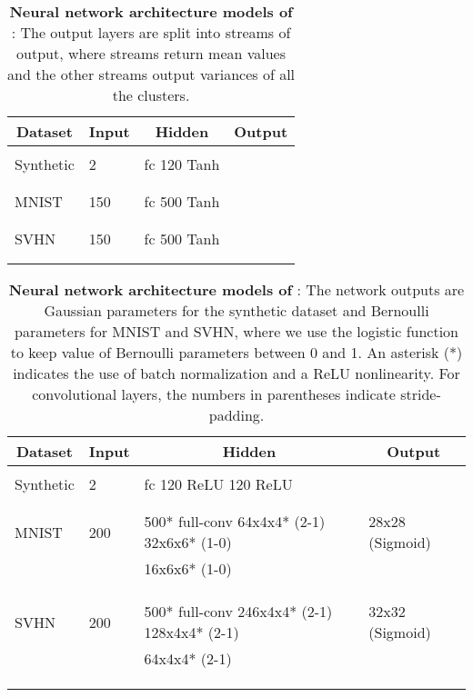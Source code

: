 \documentclass{article} \usepackage{iclr2017_conference,times}
\begin{document}
\begin{table}[ht]
\caption{\textbf{Neural network architecture models of }: The output layers are split into  streams of output, where  streams return mean values and the other  streams output variances of all the clusters.}
\label{table:architecture2}
\centering
\begin{tabular}{llll}
\multicolumn{1}{c}{\bf Dataset} &\multicolumn{1}{c}{\bf Input}  &\multicolumn{1}{c}{\bf Hidden}		&\multicolumn{1}{c}{\bf Output }
\\ \hline \\
Synthetic  & 2  &  fc 120 Tanh  &     \\
\\ \hline \\
MNIST  &150 & fc 500 Tanh &   \\
\\	\hline \\
SVHN  &150 & fc 500 Tanh  &    \\

\\ \hline \\
\end{tabular}
\end{table}

\begin{table}[ht]
\caption{\textbf{Neural network architecture models of }: The network outputs are Gaussian parameters for the synthetic dataset and Bernoulli parameters for MNIST and SVHN, where we use the logistic function to keep value of Bernoulli parameters between 0 and 1. An asterisk (*) indicates the use of batch normalization and a ReLU nonlinearity. For convolutional layers, the numbers in parentheses indicate stride-padding.}
\label{table:architecture3}
\centering
\begin{tabular}{llll}
\multicolumn{1}{c}{\bf Dataset} &\multicolumn{1}{c}{\bf Input}  &\multicolumn{1}{c}{\bf Hidden}		&\multicolumn{1}{c}{\bf Output }
\\ \hline \\
Synthetic  & 2  &  fc 120 ReLU 120 ReLU 					            &   \\
\\ \hline \\
MNIST  & 200 & 500* full-conv 64x4x4* (2-1) 32x6x6* (1-0)  & 28x28 (Sigmoid) \\
  		 & 		 & 		16x6x6* (1-0) 								 &	  \\
			 & &  												  					 &    \\
\\	\hline \\
SVHN  & 200 & 500* full-conv 246x4x4* (2-1) 128x4x4* (2-1)  &  32x32 (Sigmoid) \\
  		& & 	64x4x4* (2-1) 								 	&	  \\
			& &  											 								 &   \\
\\ \hline \\
\end{tabular}
\end{table}
\end{document}
